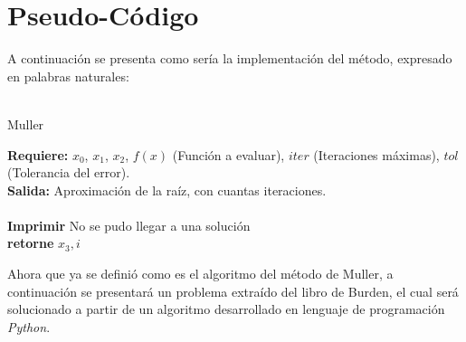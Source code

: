 \documentclass[ceqn,10pt]{SelfArx}
\begin{document}
\section{Pseudo-Código}
A continuación se presenta como sería la implementación del método,
expresado en palabras naturales:\\\
\begin{algorithm}[H] %
 \caption{Muller}
 \textbf{Requiere:} $x_{0}$, $x_{1}$, $x_{2}$, $f(x)$ (Función a evaluar), $iter$ (Iteraciones máximas), $tol$ (Tolerancia del error).\\
 \textbf{Salida:} Aproximación de la raíz, con cuantas iteraciones.\\
 \\
     \SetAlgoLined
     \textbf{Imprimir } No se pudo llegar a una solución\\
     \textbf{retorne} $x_{3},i$\\
\end{algorithm}
Ahora que ya se definió como es el algoritmo del método de Muller, a
continuación se presentará un problema extraído del libro de Burden, el
cual será solucionado a partir de un algoritmo desarrollado en lenguaje de
programación \emph{Python}.
\end{document}
